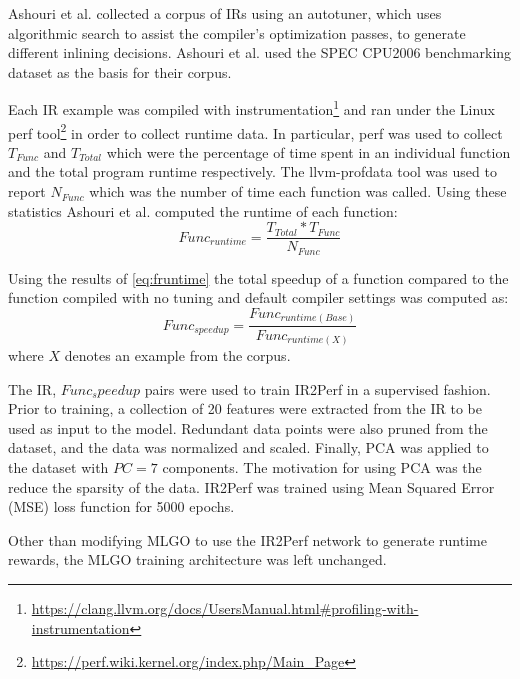 \documentclass[nohyperref]{article}
\theoremstyle{plain}
\theoremstyle{definition}
\theoremstyle{remark}
\begin{document}
Ashouri et al. collected a corpus of IRs using an autotuner, which uses algorithmic search to assist the compiler's optimization passes, to generate different inlining decisions. Ashouri et al. used the SPEC CPU2006 benchmarking dataset \cite{spec2006} as the basis for their corpus.

Each IR example was compiled with instrumentation\footnote{\href{https://clang.llvm.org/docs/UsersManual.html\#profiling-with-instrumentation}{https://clang.llvm.org/docs/UsersManual.html\#profiling-with-instrumentation}} and ran under the Linux perf tool\footnote{\href{https://perf.wiki.kernel.org/index.php/Main\_Page}{https://perf.wiki.kernel.org/index.php/Main\_Page}} in order to collect runtime data. In particular, perf was used to collect $T_{Func}$ and $T_{Total}$ which were the percentage of time spent in an individual function and the total program runtime respectively. The llvm-profdata tool was used to report $N_{Func}$ which was the number of time each function was called. Using these statistics Ashouri et al. computed the runtime of each function:
\begin{equation} \label{eq:fruntime}
    Func_{runtime} = \frac{T_{Total} * T_{Func}}{N_{Func}}
\end{equation}

Using the results of \ref{eq:fruntime} the total speedup of a function compared to the function compiled with no tuning and default compiler settings was computed as:
\begin{equation}
    Func_{speedup} = \frac{Func_{runtime(Base)}}{Func_{runtime(X)}}
\end{equation}
where $X$ denotes an example from the corpus.

The IR, $Func_speedup$ pairs were used to train IR2Perf in a supervised fashion. Prior to training, a collection of 20 features were extracted from the IR to be used as input to the model. Redundant data points were also pruned from the dataset, and the data was normalized and scaled. Finally, PCA was applied to the dataset with $PC=7$ components. The motivation for using PCA was the reduce the sparsity of the data. IR2Perf was trained using Mean Squared Error (MSE) loss function for 5000 epochs.

Other than modifying MLGO to use the IR2Perf network to generate runtime rewards, the MLGO training architecture was left unchanged.

\end{document}

